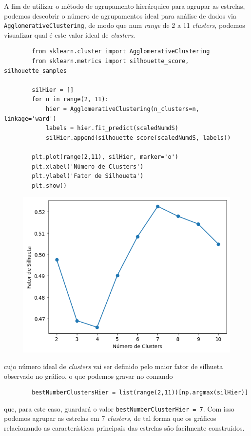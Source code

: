 

A fim de utilizar o método de agrupamento hierárquico para agrupar as estrelas, podemos descobrir o número de agrupamentos ideal para análise de dados via \verb|AgglomerativeClustering|, de modo que num \textit{range} de 2 a 11 \textit{clusters}, podemos visualizar qual é este valor ideal de \textit{clusters}.
\begin{longlisting}
    \begin{verbatim}
        from sklearn.cluster import AgglomerativeClustering
        from sklearn.metrics import silhouette_score, silhouette_samples
        
        silHier = []
        for n in range(2, 11):
            hier = AgglomerativeClustering(n_clusters=n, linkage='ward')
            labels = hier.fit_predict(scaledNumdS)
            silHier.append(silhouette_score(scaledNumdS, labels))
        
        plt.plot(range(2,11), silHier, marker='o')
        plt.xlabel('Número de Clusters')
        plt.ylabel('Fator de Silhoueta')
        plt.show()
    \end{verbatim}
\end{longlisting}
\begin{figure}[H]
    \centering
    \includegraphics[width=0.5\linewidth]{figures/HierClustSilhouette.png}
\end{figure}
cujo número ideal de \textit{clusters} vai ser definido pelo maior fator de silhueta observado no gráfico, o que podemos gravar no comando
\begin{longlisting}
    \begin{verbatim}
        bestNumberClustersHier = list(range(2,11))[np.argmax(silHier)]
    \end{verbatim}
\end{longlisting}
que, para este caso, guardará o valor \verb|bestNumberClusterHier = 7|. Com isso podemos agrupar as estrelas em 7 \textit{clusters}, de tal forma que os gráficos relacionando as características principais das estrelas são facilmente construídos.
